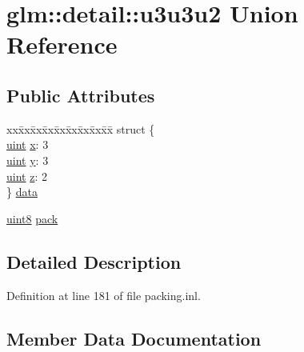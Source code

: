 \hypertarget{unionglm_1_1detail_1_1u3u3u2}{}\section{glm\+::detail\+::u3u3u2 Union Reference}
\label{unionglm_1_1detail_1_1u3u3u2}
\subsection*{Public Attributes}
\begin{DoxyCompactItemize}
\item 
\begin{tabbing}
xx\=xx\=xx\=xx\=xx\=xx\=xx\=xx\=xx\=\kill
struct \{\\
\>\mbox{\hyperlink{group__core__precision_ga4fd29415871152bfb5abd588334147c8}{uint}} \mbox{\hyperlink{unionglm_1_1detail_1_1u3u3u2_aaa6af1d1bd34a7e72c0d7b1bb622a4da}{x}}: 3\\
\>\mbox{\hyperlink{group__core__precision_ga4fd29415871152bfb5abd588334147c8}{uint}} \mbox{\hyperlink{unionglm_1_1detail_1_1u3u3u2_a2139299d7ae9d48a986ddd3edff8d669}{y}}: 3\\
\>\mbox{\hyperlink{group__core__precision_ga4fd29415871152bfb5abd588334147c8}{uint}} \mbox{\hyperlink{unionglm_1_1detail_1_1u3u3u2_a53e88031a04c880792dd6e36f8e96f9a}{z}}: 2\\
\} \mbox{\hyperlink{unionglm_1_1detail_1_1u3u3u2_a9fece3a4cafc2bb65fdbc1245b6787e8}{data}}\\

\end{tabbing}\item 
\mbox{\hyperlink{namespaceglm_1_1detail_aef2588f97d090cc19fbbe0c74fe17c8f}{uint8}} \mbox{\hyperlink{unionglm_1_1detail_1_1u3u3u2_aea48c2c7d1d3283f3c785daa33551351}{pack}}
\end{DoxyCompactItemize}


\subsection{Detailed Description}


Definition at line 181 of file packing.\+inl.



\subsection{Member Data Documentation}
\mbox{\label{unionglm_1_1detail_1_1u3u3u2_a9fece3a4cafc2bb65fdbc1245b6787e8}} 
